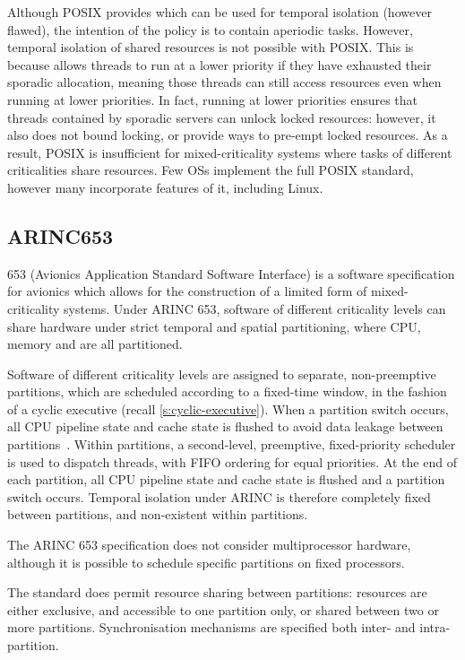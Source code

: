 Although \gls{POSIX} provides \schedsporadic which can be used for temporal isolation (however
flawed), the intention of the policy is to contain aperiodic tasks. 
However, temporal isolation of shared resources is not possible with \gls{POSIX}.
This is because \schedsporadic allows threads to run at a lower priority if 
they have exhausted their sporadic allocation, meaning those threads can still access resources
even when running at lower priorities. In fact, running at lower priorities ensures that threads
contained by sporadic servers can unlock locked resources: however, it also does not bound
locking, or provide ways to pre-empt locked resources.
As a result, \gls{POSIX} is insufficient for
mixed-criticality systems where tasks of different criticalities share resources.  Few \glspl{OS}
implement the full \gls{POSIX} standard, however many incorporate features of it, including Linux.

\subsection{ARINC653}
\label{s:arinc}

\citet{ARINC653} 653 (Avionics Application Standard Software Interface) is a software specification
for avionics which allows for the construction of a limited form of mixed-criticality systems. Under
ARINC 653, software of different criticality levels can share hardware under strict temporal and
spatial partitioning, where CPU, memory and \IO are all partitioned. 

Software of different criticality levels are assigned to separate, non-preemptive partitions, which
are scheduled according to a fixed-time window, in the fashion of a cyclic executive
(recall \cref{s:cyclic-executive}). When a partition switch occurs, all CPU pipeline state and
cache state is flushed to avoid data leakage between partitions~\citep{VanderLeest_10}. Within partitions,
a second-level, preemptive, fixed-priority scheduler is used to dispatch threads, with \gls{FIFO}
ordering for equal priorities. 
At the end of each partition, all CPU pipeline state and cache
state is flushed and a partition switch occurs. Temporal isolation under ARINC is therefore
completely fixed between partitions, and non-existent within partitions. 

The ARINC 653 specification does not consider multiprocessor hardware, although it is possible to
schedule specific partitions on fixed processors. 

The standard does permit resource sharing between partitions: resources are either
exclusive, and accessible to one partition only, or shared between two or more partitions.
Synchronisation mechanisms are specified both inter- and intra-partition. 

